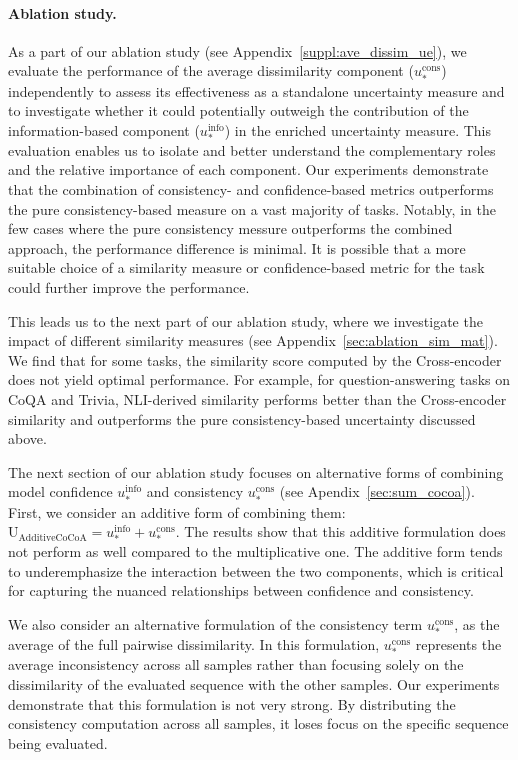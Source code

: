 \paragraph{Ablation study.}
  As a part of our ablation study (see Appendix~\ref{suppl:ave_dissim_ue}), we evaluate the performance of the average dissimilarity component (\( u_*^{\text{cons}} \)) independently to assess its effectiveness as a standalone uncertainty measure and to investigate whether it could potentially outweigh the contribution of the information-based component (\( u_*^{\text{info}} \)) in the enriched uncertainty measure. This evaluation enables us to isolate and better understand the complementary roles and the relative importance of each component. Our experiments demonstrate that the combination of consistency- and confidence-based metrics outperforms the pure consistency-based measure on a vast majority of tasks. Notably, in the few cases where the pure consistency messure outperforms the combined approach, the performance difference is minimal. It is possible that a more suitable choice of a similarity measure or confidence-based metric for the task could further improve the performance.
 
  This leads us to the next part of our ablation study, where we investigate the impact of different similarity measures (see Appendix~\ref{sec:ablation_sim_mat}). We find that for some tasks, the similarity score computed by the Cross-encoder does not yield optimal performance. For example, for question-answering tasks on CoQA and Trivia, NLI-derived similarity performs better than the Cross-encoder similarity and outperforms the pure consistency-based uncertainty discussed above.
  
  The next section of our ablation study focuses on alternative forms of combining model confidence $u_*^{\text{info}}$ and consistency $u_*^{\text{cons}}$ (see Apendix~\ref{sec:sum_cocoa}). First, we consider an additive form of combining them: $\mathrm{U}_{\text{AdditiveCoCoA}} = u_*^{\text{info}} + u_*^{\text{cons}}$. The results show that this additive formulation does not perform as well compared to the multiplicative one. The additive form tends to underemphasize the interaction between the two components, which is critical for capturing the nuanced relationships between confidence and consistency. 

  We also consider an alternative formulation of the consistency term $u_*^{\text{cons}} $, as the average of the full pairwise dissimilarity. In this formulation,  $u_*^{\text{cons}}$ represents the average inconsistency across all samples rather than focusing solely on the dissimilarity of the evaluated sequence with the other samples. Our experiments demonstrate that this formulation is not very strong. By distributing the consistency computation across all samples, it loses focus on the specific sequence being evaluated.

